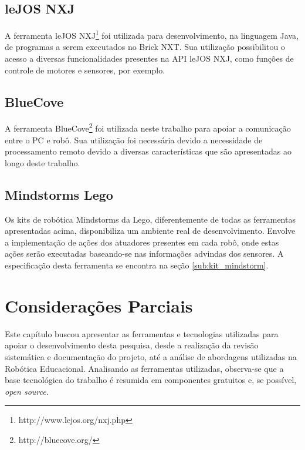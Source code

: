 	\subsection{leJOS NXJ} %
	\label{sub:lejos_nxj}
		A ferramenta leJOS NXJ\footnote{http://www.lejos.org/nxj.php} foi utilizada para desenvolvimento, na linguagem Java, de programas a serem executados no Brick NXT. Sua utilização possibilitou o acesso a diversas funcionalidades presentes na API leJOS NXJ, como funções de controle de motores e sensores, por exemplo.


	\subsection{BlueCove} %
	\label{sub:bluecove}

		A ferramenta BlueCove\footnote{http://bluecove.org/} foi utilizada neste trabalho para apoiar a comunicação entre o PC e robô. Sua utilização foi necessária devido a necessidade de processamento remoto devido a diversas características que são apresentadas ao longo deste trabalho.


	\subsection{Mindstorms Lego} %
	\label{sub:mindstorm_lego}

		Os kits de robótica Mindstorms da Lego, diferentemente de todas as ferramentas apresentadas acima, disponibiliza um ambiente real de desenvolvimento. Envolve a implementação de ações dos atuadores presentes em cada robô, onde estas ações serão executadas baseando-se nas informações advindas dos sensores. A especificação desta ferramenta se encontra na seção \ref{sub:kit_mindstorm}.


\section{Considerações Parciais} %
\label{sec:considerações_parciais}

	Este capítulo buscou apresentar as ferramentas e tecnologias utilizadas para apoiar o desenvolvimento desta pesquisa, desde a realização da revisão sistemática e documentação do projeto, até a análise de abordagens utilizadas na Robótica Educacional. Analisando as ferramentas utilizadas, observa-se que a base tecnológica do trabalho é resumida em componentes gratuitos e, se possível, \textit{open source}.

